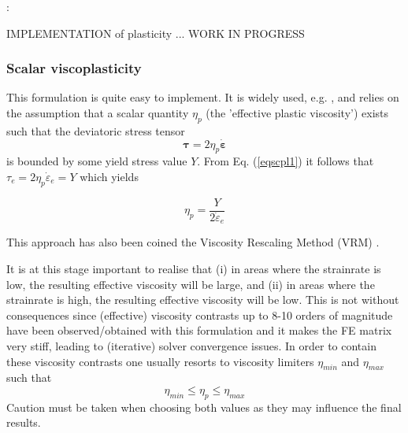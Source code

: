 
\Literature: \cite{mumc03,chpe15,momu06,muso11}





















IMPLEMENTATION of plasticity ... WORK IN PROGRESS

\subsubsection{Scalar viscoplasticity}

This formulation is quite easy to implement. It is widely used, e.g. \cite{will92,thfb08,spmw16}, and relies on the assumption that 
a scalar quantity $\eta_p$ (the 'effective plastic viscosity') exists such that the deviatoric stress tensor 
\begin{equation}
{\bm \tau}=2\eta_p \dot{\bm\varepsilon} \label{eqscpl1}
\end{equation}
is bounded by some yield stress value $Y$.
From Eq. (\ref{eqscpl1}) it follows that ${\tau}_{e}= 2\eta_p \dot{\varepsilon}_{e}=Y$ which yields
\begin{mdframed}[backgroundcolor=blue!5]
\[
\eta_p = \frac{Y}{2 \dot{\varepsilon}_{e}}
\]
\end{mdframed}
This approach has also been coined the Viscosity Rescaling Method (VRM) \cite{kacha04}. 
 


It is at this stage important to realise that (i) in areas where the strainrate is low, the resulting effective viscosity will be large, and 
(ii) in areas where the strainrate is high, the resulting effective viscosity will be low. This is not without consequences since 
(effective) viscosity contrasts up to 8-10 orders of magnitude have been observed/obtained with this formulation and it makes the FE 
matrix very stiff, leading to (iterative) solver convergence issues.
In order to contain these viscosity contrasts one usually resorts to viscosity limiters $\eta_{min}$ and $\eta_{max}$ such that 
\[
\eta_{min} \leq \eta_p \leq \eta_{max}
\]
Caution must be taken when choosing both values as they may influence the final results.


